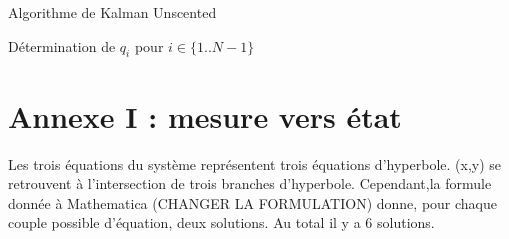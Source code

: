 \documentclass[a4paper, 8pt]{article}
\begin{document}
Algorithme de Kalman Unscented
\begin{algorithm}[H]
		
	\caption{Détermination de $q_i$ pour $i \in \{1..N-1\}$}
	\end{algorithm}




\section{Annexe I : mesure vers état}

Les trois équations du système représentent trois équations d'hyperbole. (x,y) se retrouvent à l'intersection de trois branches d'hyperbole. Cependant,la formule donnée à Mathematica (CHANGER LA FORMULATION) donne, pour chaque couple possible d'équation, deux solutions. Au total il y a 6 solutions.
\end{document}
